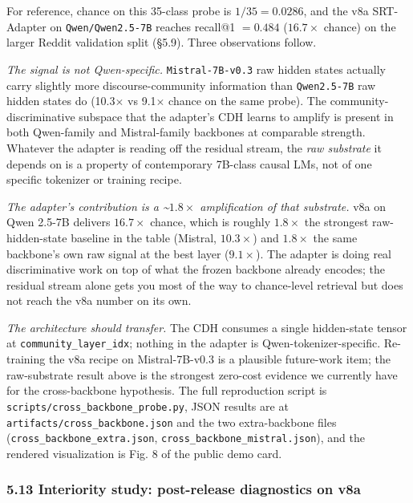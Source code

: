 \documentclass[
  11pt]{article}
\begin{document}
For reference, chance on this 35-class probe is \(1/35 = 0.0286\), and
the v8a SRT-Adapter on \texttt{Qwen/Qwen2.5-7B} reaches recall@1
\(= 0.484\) (\(16.7\times\) chance) on the larger Reddit validation
split (§5.9). Three observations follow.

\emph{The signal is not Qwen-specific.} \texttt{Mistral-7B-v0.3} raw
hidden states actually carry slightly more discourse-community
information than \texttt{Qwen2.5-7B} raw hidden states do
(10.3\(\times\) vs 9.1\(\times\) chance on the same probe). The
community-discriminative subspace that the adapter's CDH learns to
amplify is present in both Qwen-family and Mistral-family backbones at
comparable strength. Whatever the adapter is reading off the residual
stream, the \emph{raw substrate} it depends on is a property of
contemporary 7B-class causal LMs, not of one specific tokenizer or
training recipe.

\emph{The adapter's contribution is a \textasciitilde{}\(1.8\times\)
amplification of that substrate.} v8a on Qwen 2.5-7B delivers
\(16.7\times\) chance, which is roughly \(1.8\times\) the strongest
raw-hidden-state baseline in the table (Mistral, \(10.3\times\)) and
\(1.8\times\) the same backbone's own raw signal at the best layer
(\(9.1\times\)). The adapter is doing real discriminative work on top of
what the frozen backbone already encodes; the residual stream alone gets
you most of the way to chance-level retrieval but does not reach the v8a
number on its own.

\emph{The architecture should transfer.} The CDH consumes a single
hidden-state tensor at \texttt{community\_layer\_idx}; nothing in the
adapter is Qwen-tokenizer-specific. Re-training the v8a recipe on
Mistral-7B-v0.3 is a plausible future-work item; the raw-substrate
result above is the strongest zero-cost evidence we currently have for
the cross-backbone hypothesis. The full reproduction script is
\texttt{scripts/cross\_backbone\_probe.py}, JSON results are at
\texttt{artifacts/cross\_backbone.json} and the two extra-backbone files
(\texttt{cross\_backbone\_extra.json},
\texttt{cross\_backbone\_mistral.json}), and the rendered visualization
is Fig. 8 of the public demo card.

\subsubsection{5.13 Interiority study: post-release diagnostics on
v8a}\label{interiority-study-post-release-diagnostics-on-v8a}
\end{document}

